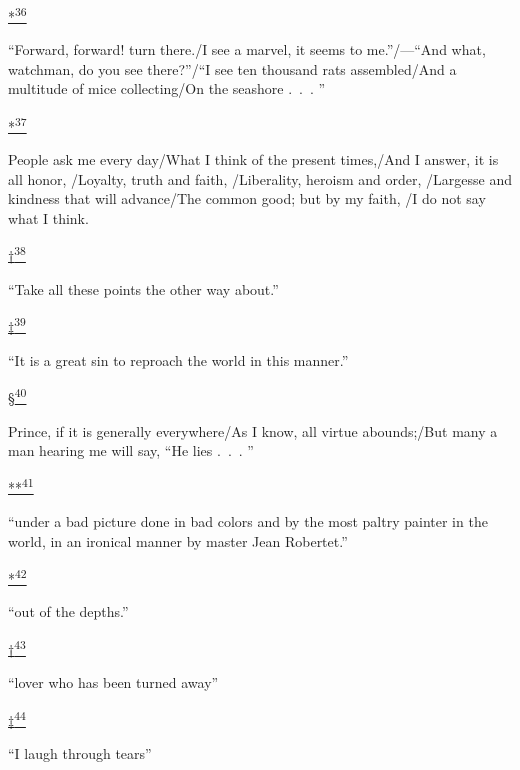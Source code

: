 \protect\hypertarget{23_NOTES.xhtmlux5cux23id_2366}{\protect\hyperlink{21_Chapter_Thirteen__IMAGE_AND_WORD.xhtmlux5cux23id_2365}{*\textsuperscript{36}}}
``Forward, forward! turn there./I see a marvel, it seems to
me.''/---``And what, watchman, do you see there?''/``I see ten thousand
rats assembled/And a multitude of mice collecting/On the seashore .~.~.
''

\protect\hypertarget{23_NOTES.xhtmlux5cux23id_2368}{\protect\hyperlink{21_Chapter_Thirteen__IMAGE_AND_WORD.xhtmlux5cux23id_2367}{*\textsuperscript{37}}}
People ask me every day/What I think of the present times,/And I answer,
it is all honor, /Loyalty, truth and faith, /Liberality, heroism and
order, /Largesse and kindness that will advance/The common good; but by
my faith, /I do not say what I think.

\protect\hypertarget{23_NOTES.xhtmlux5cux23id_2370}{\protect\hyperlink{21_Chapter_Thirteen__IMAGE_AND_WORD.xhtmlux5cux23id_2369}{†\textsuperscript{38}}}
``Take all these points the other way about.''

\protect\hypertarget{23_NOTES.xhtmlux5cux23id_2372}{\protect\hyperlink{21_Chapter_Thirteen__IMAGE_AND_WORD.xhtmlux5cux23id_2371}{‡\textsuperscript{39}}}
``It is a great sin to reproach the world in this manner.''

\protect\hypertarget{23_NOTES.xhtmlux5cux23id_2374}{\protect\hyperlink{21_Chapter_Thirteen__IMAGE_AND_WORD.xhtmlux5cux23id_2373}{§\textsuperscript{40}}}
Prince, if it is generally everywhere/As I know, all virtue abounds;/But
many a man hearing me will say, ``He lies .~.~. ''

\protect\hypertarget{23_NOTES.xhtmlux5cux23id_2376}{\protect\hyperlink{21_Chapter_Thirteen__IMAGE_AND_WORD.xhtmlux5cux23id_2375}{**\textsuperscript{41}}}
``under a bad picture done in bad colors and by the most paltry painter
in the world, in an ironical manner by master Jean Robertet.''

\protect\hypertarget{23_NOTES.xhtmlux5cux23id_2870}{\protect\hyperlink{21_Chapter_Thirteen__IMAGE_AND_WORD.xhtmlux5cux23id_2869}{*\textsuperscript{42}}}
``out of the depths.''

\protect\hypertarget{23_NOTES.xhtmlux5cux23id_2868}{\protect\hyperlink{21_Chapter_Thirteen__IMAGE_AND_WORD.xhtmlux5cux23id_2867}{†\textsuperscript{43}}}
``lover who has been turned away''

\protect\hypertarget{23_NOTES.xhtmlux5cux23id_2866}{\protect\hyperlink{21_Chapter_Thirteen__IMAGE_AND_WORD.xhtmlux5cux23id_2865}{‡\textsuperscript{44}}}
``I laugh through tears''

